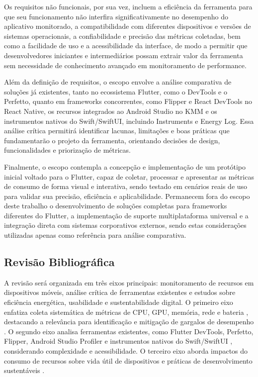 \documentclass[12pt,a4paper]{article}
\begin{document}
Os requisitos não funcionais, por sua vez, incluem a eficiência da ferramenta para que seu funcionamento não interfira significativamente no desempenho do aplicativo monitorado, a compatibilidade com diferentes dispositivos e versões de sistemas operacionais, a confiabilidade e precisão das métricas coletadas, bem como a facilidade de uso e a acessibilidade da interface, de modo a permitir que desenvolvedores iniciantes e intermediários possam extrair valor da ferramenta sem necessidade de conhecimento avançado em monitoramento de performance.  

Além da definição de requisitos, o escopo envolve a análise comparativa de soluções já existentes, tanto no ecossistema Flutter, como o DevTools e o Perfetto, quanto em frameworks concorrentes, como Flipper e React DevTools no React Native, os recursos integrados ao Android Studio no KMM e os instrumentos nativos do Swift/SwiftUI, incluindo Instruments e Energy Log. Essa análise crítica permitirá identificar lacunas, limitações e boas práticas que fundamentarão o projeto da ferramenta, orientando decisões de design, funcionalidades e priorização de métricas.  

Finalmente, o escopo contempla a concepção e implementação de um protótipo inicial voltado para o Flutter, capaz de coletar, processar e apresentar as métricas de consumo de forma visual e interativa, sendo testado em cenários reais de uso para validar sua precisão, eficiência e aplicabilidade. Permanecem fora do escopo deste trabalho o desenvolvimento de soluções completas para frameworks diferentes do Flutter, a implementação de suporte multiplataforma universal e a integração direta com sistemas corporativos externos, sendo estas considerações utilizadas apenas como referência para análise comparativa.


\subsection{Revisão Bibliográfica}
A revisão será organizada em três eixos principais: monitoramento de recursos em dispositivos móveis, análise crítica de ferramentas existentes e estudos sobre eficiência energética, usabilidade e sustentabilidade digital. O primeiro eixo enfatiza coleta sistemática de métricas de CPU, GPU, memória, rede e bateria \cite{monitoring}, destacando a relevância para identificação e mitigação de gargalos de desempenho \cite{performance}. O segundo eixo analisa ferramentas existentes, como Flutter DevTools, Perfetto, Flipper, Android Studio Profiler e instrumentos nativos do Swift/SwiftUI \cite{flutter, dart}, considerando complexidade e acessibilidade. O terceiro eixo aborda impactos do consumo de recursos sobre vida útil de dispositivos e práticas de desenvolvimento sustentáveis \cite{energy, mobile_energy}.  
\end{document}
